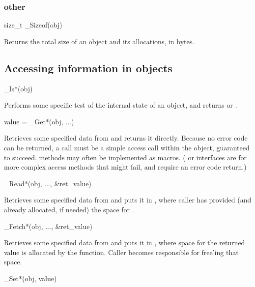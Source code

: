   \subsubsection{other}
\begin{sreapi}
\hypertarget{ifc:Sizeof}
{\item[size\_t \_Sizeof(obj)]}

Returns the total size of an object and its allocations, in bytes.
\end{sreapi}


 \subsection{Accessing information in objects}

\begin{sreapi}

\hypertarget{ifc:Is}
{\item[\_Is*(obj)]}

Performs some specific test of the internal state of an
object, and returns  or .

\hypertarget{ifc:Get}
{\item[value = \_Get*(obj, ...)]}

Retrieves some specified data from  and returns it
directly. Because no error code can be returned, a 
call must be a simple access call within the object, guaranteed to
succeed.  methods may often be implemented as macros.
( or  interfaces are for more complex
access methods that might fail, and require an error code return.)

\hypertarget{ifc:Read}
{\item[\_Read*(obj, ..., \&ret\_value)]}

Retrieves some specified data from  and puts it in
, where caller has provided (and already allocated,
if needed) the space for .

\hypertarget{ifc:Fetch}
{\item[\_Fetch*(obj, ..., \&ret\_value)]}

Retrieves some specified data from  and puts it in
, where space for the returned value is allocated by
the function. Caller becomes responsible for free'ing that space.

\hypertarget{ifc:Set}
{\item[\_Set*(obj, value)]}


\end{sreapi}
